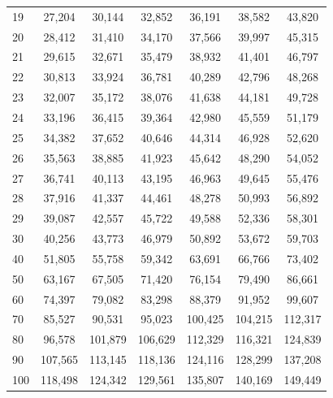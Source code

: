 \documentclass[
]{article}
\begin{document}
\begin{table}[!h]
\begin{tabular}[t]{lcccccc}
19 & 27,204 & 30,144 & 32,852 & 36,191 & 38,582 & 43,820\\
20 & 28,412 & 31,410 & 34,170 & 37,566 & 39,997 & 45,315\\
21 & 29,615 & 32,671 & 35,479 & 38,932 & 41,401 & 46,797\\
22 & 30,813 & 33,924 & 36,781 & 40,289 & 42,796 & 48,268\\
23 & 32,007 & 35,172 & 38,076 & 41,638 & 44,181 & 49,728\\
24 & 33,196 & 36,415 & 39,364 & 42,980 & 45,559 & 51,179\\
25 & 34,382 & 37,652 & 40,646 & 44,314 & 46,928 & 52,620\\
26 & 35,563 & 38,885 & 41,923 & 45,642 & 48,290 & 54,052\\
27 & 36,741 & 40,113 & 43,195 & 46,963 & 49,645 & 55,476\\
28 & 37,916 & 41,337 & 44,461 & 48,278 & 50,993 & 56,892\\
29 & 39,087 & 42,557 & 45,722 & 49,588 & 52,336 & 58,301\\
30 & 40,256 & 43,773 & 46,979 & 50,892 & 53,672 & 59,703\\
40 & 51,805 & 55,758 & 59,342 & 63,691 & 66,766 & 73,402\\
50 & 63,167 & 67,505 & 71,420 & 76,154 & 79,490 & 86,661\\
60 & 74,397 & 79,082 & 83,298 & 88,379 & 91,952 & 99,607\\
70 & 85,527 & 90,531 & 95,023 & 100,425 & 104,215 & 112,317\\
80 & 96,578 & 101,879 & 106,629 & 112,329 & 116,321 & 124,839\\
90 & 107,565 & 113,145 & 118,136 & 124,116 & 128,299 & 137,208\\
100 & 118,498 & 124,342 & 129,561 & 135,807 & 140,169 & 149,449\\
\bottomrule
\end{tabular}
\end{table}
\end{document}
